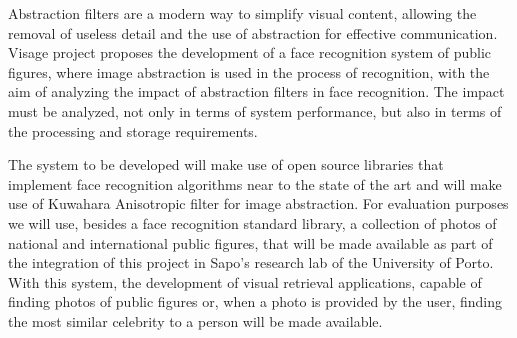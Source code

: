 Abstraction filters are a modern way to simplify visual content, allowing the removal of useless detail and the use of abstraction for effective communication. Visage project proposes the development of a face recognition system of public figures, where image abstraction is used in the process of recognition, with the aim of analyzing the impact of abstraction filters in face recognition. The impact must be analyzed, not only in terms of system performance, but also in terms of the processing and storage requirements.

The system to be developed will make use of open source libraries that implement face recognition algorithms near to the state of the art and will make use of Kuwahara Anisotropic filter for image abstraction. For evaluation purposes we will use, besides a face recognition standard library, a collection of photos of national and international public figures, that will be made available as part of the integration of this project in Sapo's research lab of the University of Porto. With this system, the development of visual retrieval applications, capable of finding photos of public figures or, when a photo is provided by the user, finding the most similar celebrity to a person will be made available.